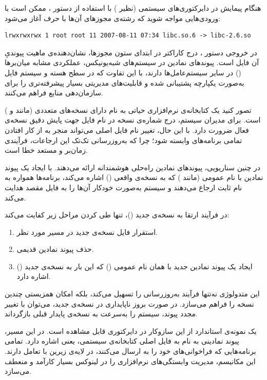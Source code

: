 هنگام پیمایش در دایرکتوری‌های سیستمی (نظیر ) با استفاده از دستور ، ممکن است با ورودی‌هایی مواجه شوید که رشته‌ی مجوزهای آن‌ها با حرف  آغاز می‌شود:

\begin{latin}
\begin{lstlisting}
lrwxrwxrwx 1 root root 11 2007-08-11 07:34 libc.so.6 -> libc-2.6.so
\end{lstlisting}
\end{latin}

در خروجی دستور ، درج کاراکتر  در ابتدای ستون مجوزها، نشان‌دهنده‌ی ماهیت پیوندیِ آن فایل است. پیوندهای نمادین در سیستم‌های شبه‌یونیکس، عملکردی مشابه میان‌برها () در سایر سیستم‌عامل‌ها دارند، با این تفاوت که در سطح هسته و سیستم‌ فایل به‌صورت یکپارچه پشتیبانی شده و قابلیت‌های مدیریتی بسیار پیشرفته‌تری را برای سازمان‌دهی منابع فراهم می‌کنند.

تصور کنید یک کتابخانه‌ی نرم‌افزاری حیاتی به نام  دارای نسخه‌های متعددی (مانند  و ) است. برای مدیران سیستم، درج شماره‌ی نسخه در نام فایل جهت پایش دقیق نسخه‌ی فعال ضرورت دارد. با این حال، تغییر نام فایل اصلی می‌تواند منجر به از کار افتادن تمامی برنامه‌های وابسته شود؛ چرا که به‌روزرسانی تک‌تک این ارجاعات، فرآیندی زمان‌بر و مستعد خطا است.

در چنین سناریویی، پیوندهای نمادین راه‌حلی هوشمندانه ارائه می‌دهند. با ایجاد یک پیوند نمادین با نام عمومی (مانند ) که به نسخه‌ی واقعی () اشاره می‌کند، برنامه‌ها همواره به نام ثابت  ارجاع می‌دهند و سیستم به‌صورت خودکار آن‌ها را به فایل مقصد هدایت می‌کند.

در فرآیند ارتقا به نسخه‌ی جدید ()، تنها طی کردن مراحل زیر کفایت می‌کند:

\begin{enumerate}
  \item استقرار فایل نسخه‌ی جدید در مسیر مورد نظر.
  \item حذف پیوند نمادین قدیمی.
  \item ایجاد یک پیوند نمادین جدید با همان نام عمومی () که این بار به نسخه‌ی جدید () اشاره دارد.
\end{enumerate}

این متدولوژی نه‌تنها فرآیند به‌روزرسانی را تسهیل می‌کند، بلکه امکان همزیستی چندین نسخه را فراهم می‌سازد. در صورت بروز ناپایداری در نسخه‌ی جدید، می‌توان با تغییر مجدد پیوند، سیستم را به‌سرعت به نسخه‌ی پایدار قبلی بازگرداند.

یک نمونه‌ی استاندارد از این سازوکار در دایرکتوری  قابل مشاهده است. در این مسیر، پیوند نمادینی به نام  به فایل اصلی کتابخانه‌ی سیستمی، یعنی  اشاره دارد. تمامی برنامه‌هایی که فراخوانی‌های خود را به  ارسال می‌کنند، در لایه‌ی زیرین با  تعامل دارند. این مکانیسم، مدیریت وابستگی‌های نرم‌افزاری را در لینوکس بسیار کارآمد و منعطف می‌سازد.

